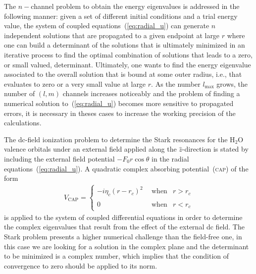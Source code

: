 The $n-$channel problem to obtain the energy eigenvalues is addressed
in the following manner: given a set of different initial conditions
and a trial energy value, the system of coupled
equations~(\ref{eq:radial_u}) can generate $n$ independent solutions
that are propagated to a given endpoint at large $r$ where one can
build a determinant of the solutions that is ultimately minimized in
an iterative process to find the optimal combination of solutions that
leads to a zero, or small valued, determinant. Ultimately, one wants
to find the energy eigenvalue associated to the overall solution that
is bound at some outer radius, i.e., that evaluates to zero or a very
small value at large $r$. As the number $l_{\mathrm{max}}$ grows, the
number of $(l,m)$ channels increases noticeably and the problem of
finding a numerical solution to~(\ref{eq:radial_u}) becomes more
sensitive to propagated errors, it is necessary in theses cases to
increase the working precision of the calculations.


The dc-field ionization problem to determine the Stark resonances for
the H$_{2}$O valence orbitals under an external field applied along
the $\hat{z}$-direction is stated by including the external field
potential $-F_{0}r\cos\theta$ in the radial
equations~(\ref{eq:radial_u}). A quadratic complex absorbing
potential~(\textsc{cap}) of the form
%
\begin{eqnarray}
  V_{\mathrm{CAP}} = \left\{
  \begin{split}
    -i \eta_{c}(r - r_{c})^{2} \ & \mathrm{~when} & r > r_{c} \\
    0 \phantom{i \eta_{c}(r - r_{c})^{2}} \ & \mathrm{~when} &  r < r_{c}
  \end{split}
  \right.
\label{eq:VCAP}
\end{eqnarray}
%
is applied to the system of coupled differential equations in order to
determine the complex eigenvalues that result from the effect of the
external dc field. The Stark problem presents a higher numerical
challenge than the field-free one, in this case we are looking for a
solution in the complex plane and the determinant to be minimized is a
complex number, which implies that the condition of convergence to
zero should be applied to its norm.


